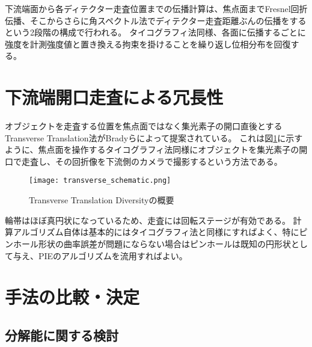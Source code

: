 下流端面から各ディテクター走査位置までの伝播計算は、焦点面までFresnel回折伝播、そこからさらに角スペクトル法でディテクター走査距離ぶんの伝播をするという2段階の構成で行われる。
タイコグラフィ法同様、各面に伝播するごとに強度を計測強度値と置き換える拘束を掛けることを繰り返し位相分布を回復する。

\clearpage
\newpage

\section{下流端開口走査による冗長性}
\label{chap3_transverse_introduction}

オブジェクトを走査する位置を焦点面ではなく集光素子の開口直後とするTransverse Translation法がBradyらによって提案されている。\cite{Brady2009}
これは図\ref{fig:transverse_schematic}に示すように、焦点面を操作するタイコグラフィ法同様にオブジェクトを集光素子の開口で走査し、その回折像を下流側のカメラで撮影するという方法である。

\begin{figure}[!ht]
\centering
\texttt{[image: transverse\_schematic.png]}
\caption{Transverse Translation Diversityの概要}
\label{fig:transverse_schematic}
\end{figure}

輪帯はほぼ真円状になっているため、走査には回転ステージが有効である。
計算アルゴリズム自体は基本的にはタイコグラフィ法と同様にすればよく、特にピンホール形状の曲率誤差が問題にならない場合はピンホールは既知の円形状として与え、PIEのアルゴリズムを流用すればよい。

\clearpage
\newpage

\section{手法の比較・決定}

\subsection{分解能に関する検討}
\label{chap3_comparison_resolution}

